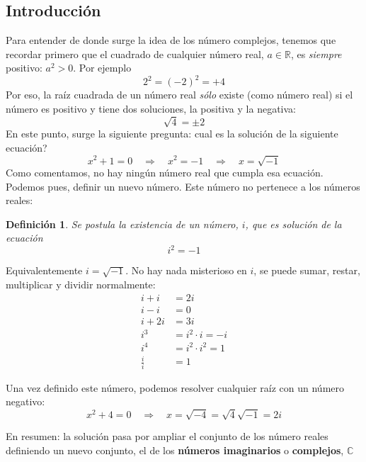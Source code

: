 \documentclass[a4paper,11pt]{book} %
\newtheorem{definicion_contador}{Definición}
\newcommand{\Definicion}[1]{
		\begin{mybox_gray2}{}
			\begin{definicion_contador}
				 #1 
			\end{definicion_contador} 
		\end{mybox_gray2}
	}
\numberwithin{equation}{chapter}
\def\rqa{\quad \Rightarrow \quad}
\begin{document}
		\subsection{Introducción}
		
Para entender de donde surge la idea de los número complejos, tenemos que recordar primero que el cuadrado de cualquier número real, $a \in \mathbb{R}$, es \textit{siempre} positivo: $a^2 > 0$. Por ejemplo
	\begin{equation*}
	2^2 = (-2)^2 = +4
	\end{equation*}
Por eso, la raíz cuadrada de un número real \textit{sólo} existe (como número real) si el número es positivo y tiene dos soluciones, la positiva y la negativa:
	\begin{equation*}
	\sqrt{4} = \pm 2
	\end{equation*}
En este punto, surge la siguiente pregunta: cual es la solución de la siguiente ecuación?
	\begin{equation}
	x^2 + 1 = 0 \rqa x^2 = -1 \rqa x = \sqrt{-1}
	\end{equation}
Como comentamos, no hay ningún número real que cumpla esa ecuación. Podemos pues, definir un nuevo número. Este número no pertenece a los números reales:

	\Definicion{Se postula la existencia de un número, $i$, que es solución de la ecuación
		\begin{equation}
		i^2 = -1
		\end{equation}}

Equivalentemente $i = \sqrt{-1}$. No hay nada misterioso en $i$, se puede sumar, restar, multiplicar y dividir normalmente:
	\begin{align*}
	i + i & = 2i \\
	i - i & = 0 \\
	i + 2i & = 3i \\
	i^3 & = i^2 \cdot i = -i \\
	i^4 & = i^2 \cdot i^2  = 1 \\
	\frac{i}{i} & = 1
	\end{align*}

Una vez definido este número, podemos resolver cualquier raíz con un número negativo:
	\begin{equation}
	x^2 + 4 = 0  \rqa x = \sqrt{-4} = \sqrt{4} \sqrt{-1} = 2i
	\end{equation}

En resumen: la solución pasa por ampliar el conjunto de los número reales definiendo un nuevo conjunto, el de los \textbf{números imaginarios} o \textbf{complejos}, $\mathbb{C}$
\end{document}
